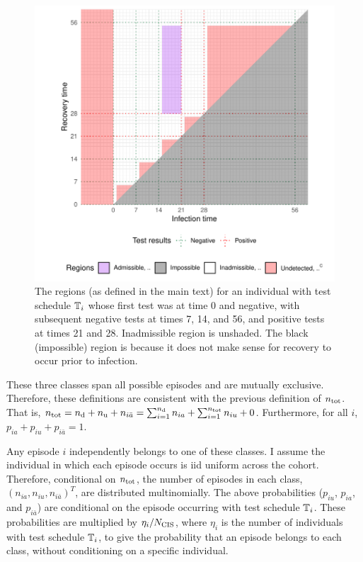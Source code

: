 \documentclass[thesis.tex]{subfiles}
\begin{document}
\begin{figure}
\includegraphics[width=\textwidth]{cis-perfect-testing/regions_diag}
\caption[Admissible, inadmissible, and undetected infections]{The regions (as defined in the main text) for an individual with test schedule $\mathbb{T}_i$ whose first test was at time 0 and negative, with subsequent
negative tests at times 7, 14, and 56, and positive tests at times 21
and 28. Inadmissible region is unshaded. The black (impossible) region is because it does not make sense for recovery to occur prior to infection. \label{perf-test:fig:partitionSpace}}
\end{figure}

These three classes span all possible episodes and are mutually exclusive.
Therefore, these definitions are consistent with the previous definition of $n_\text{tot}$.
That is, $n_\text{tot} = n_\text{d} + n_\text{u} + n_{i\bar{a}} = \sum_{i=1}^{n_\text{d}} n_{ia} + \sum_{i=1}^{n_\text{tot}} n_{iu} + 0$.
Furthermore, for all $i$, $p_{ia} + p_{iu} + p_{i\bar{a}} = 1$.

Any episode $i$ independently belongs to one of these classes.
I assume the individual in which each episode occurs is iid uniform across the cohort.
Therefore, conditional on $n_\text{tot}$, the number of episodes in each class, $(n_{ia}, n_{iu}, n_{i\bar{a}})^T$, are distributed multinomially.
The above probabilities ($p_{iu}$, $p_{ia}$, and $p_{i\bar{a}}$) are conditional on the episode occurring with test schedule $\mathbb{T}_i$.
These probabilities are multiplied by $\eta_i/N_\text{CIS}$, where $\eta_i$ is the number of individuals with test schedule $\mathbb{T}_i$, to give the probability that an episode belongs to each class, without conditioning on a specific individual.
\end{document}
